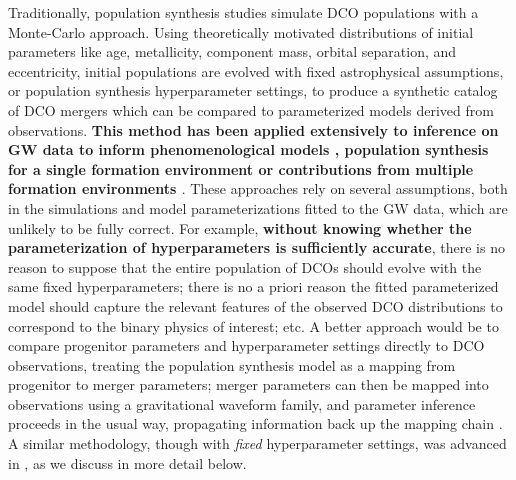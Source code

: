 \documentclass[twocolumn]{aastex631}
\begin{document}
Traditionally, population synthesis studies simulate DCO populations with a
Monte-Carlo approach. Using theoretically motivated distributions of initial
parameters like age, metallicity, component mass, orbital separation, and
eccentricity, initial populations are evolved with fixed astrophysical
assumptions, or population synthesis hyperparameter settings, to produce a
synthetic catalog of DCO mergers which can be compared to parameterized models
derived from observations. \textbf{This method has been applied extensively to
inference on GW data to inform phenomenological models
\citep[e.g.][]{Fishbach2017, Wysocki2019, Callister2021, Delfavero2021,
Farah2022, Delfavero2022}, population synthesis for a single formation
environment \citep[e.g.][]{Belczynski2016, Stevenson2017b, Taylor2018,
Barrett2018, Mastrogiovanni2022} or contributions from multiple formation
environments \citep[e.g][]{Zevin2017, Stevenson2017, Bouffanais2019, Zevin2021,
Wong2021, Bouffanais2021, Mapelli2022}}. These approaches rely on several
assumptions, both in the simulations and model parameterizations fitted to the
GW data, which are unlikely to be fully correct. For example, \textbf{without
knowing whether the parameterization of hyperparameters is sufficiently
accurate}, there is no reason to suppose that the entire population of DCOs
should evolve with the same fixed hyperparameters; there is no a priori reason
the fitted parameterized model should capture the relevant features of the
observed DCO distributions to correspond to the binary physics of interest; etc.
A better approach would be to compare progenitor parameters and hyperparameter
settings directly to DCO observations, treating the population synthesis model
as a mapping from progenitor to merger parameters; merger parameters can then be
mapped into observations using a gravitational waveform family, and parameter
inference proceeds in the usual way, propagating information back up the mapping
chain \citep[e.g.][]{Veitch2015}.  A similar methodology, though with
\emph{fixed} hyperparameter settings, was advanced in
\citet{Andrews2018,Andrews2021}, as we discuss in more detail below.
\end{document}
